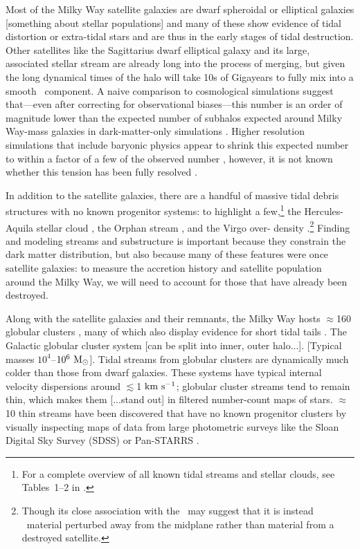 Most of the Milky Way satellite galaxies are dwarf spheroidal or elliptical
galaxies [something about stellar populations] and many of these show evidence
of tidal distortion or extra-tidal stars \citep[e.g.,][]{todo-hercules, todo}
and are thus in the early stages of tidal destruction. Other satellites like the
Sagittarius dwarf elliptical galaxy and its large, associated stellar stream are
already long into the process of merging, but given the long dynamical times of
the halo will take 10s of Gigayears to fully mix into a smooth \mwhalo\
component. A naive comparison to cosmological simulations suggest that---even
after correcting for observational biases---this number is an order of magnitude
lower than the expected number of subhalos expected around Milky Way-mass
galaxies in dark-matter-only simulations \citep[$\sim$1000;][]{missing-
satellites-todo}. Higher resolution simulations that include baryonic physics
appear to shrink this expected number to within a factor of a few of the
observed number \citep{todo}, however, it is not known whether this tension has
been fully resolved \citep{todo}.

In addition to the satellite galaxies, there are a handful of massive tidal
debris structures with no known progenitor systems: to highlight a
few,\footnote{For a complete overview of all known tidal streams and stellar
clouds, see Tables~1--2 in \cite{grillmair16}.} the Hercules-Aquila stellar
cloud \citep{todo}, the Orphan stream \citep{grillmair06b}, and the Virgo over-
density \citep{todo}.\footnote{Though its close association with the \mwdisk\
may suggest that it is instead \mwdisk\ material perturbed away from the
midplane rather than material from a destroyed satellite.} Finding and modeling
streams and substructure is important because they constrain the dark matter
distribution, but also because many of these features were once satellite
galaxies: to measure the accretion history and satellite population around the
Milky Way, we will need to account for those that have already been destroyed.

Along with the satellite galaxies and their remnants, the Milky Way hosts
$\approx$160 globular clusters \citep{harris10}, many of which also display
evidence for short tidal tails \citep{grillmair95, leon00}. The Galactic
globular cluster system [can be split into inner, outer halo...]. [Typical
masses $10^4$--$10^6~\mathrm{M}_\odot$]. Tidal streams from globular clusters are
dynamically much colder than those from dwarf galaxies. These systems have
typical internal velocity dispersions around $\lesssim$1$~\mathrm{km}~\mathrm{s}^{-1}$; globular
cluster streams tend to remain thin, which makes them [...stand out] in filtered
number-count maps of stars. $\approx$10 thin streams have been discovered that
have no known progenitor clusters by visually inspecting maps of data from large
photometric surveys like the Sloan Digital Sky Survey (SDSS) or Pan-STARRS
\citep[e.g.,][]{grillmair06a, bonaca12, bernard14}.

